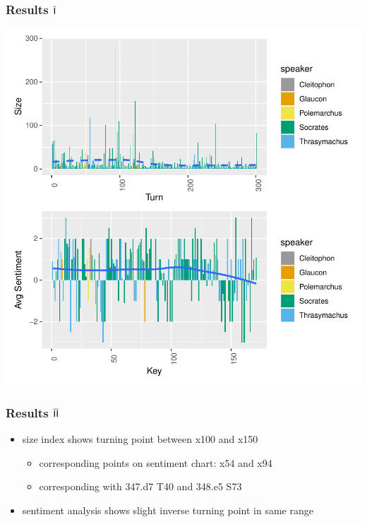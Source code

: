 \documentclass{beamer}
\renewcommand{\Roman}[1]{$\overline{\textsf{\small{\MakeUppercase{\romannumeral #1}}}}$}
\begin{document}
\begin{frame}[fragile]
\frametitle{Results \Roman{1}}
\includegraphics{GreatSlideshow-017}
\end{frame}


\begin{frame}
\frametitle{Results \Roman{2}}
\begin{itemize}
\item size index shows turning point between x100 and x150
  \begin{itemize}
  \item corresponding points on sentiment chart: x54 and x94
  \item corresponding with 347.d7 T40 and 348.e5 S73
  \end{itemize}
\item sentiment analysis shows slight inverse turning point in same range
\end{itemize}
\end{frame}
\end{document}
